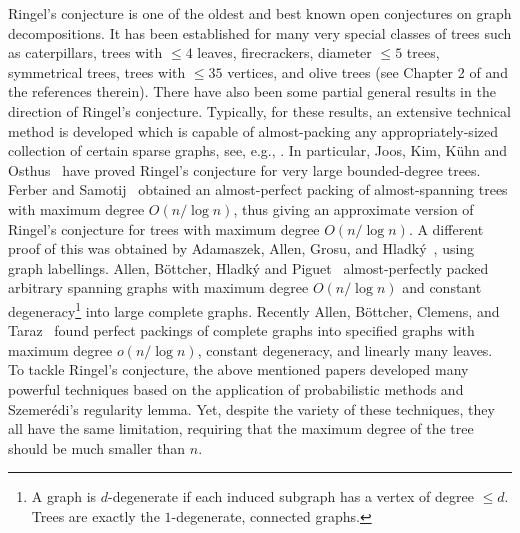 \documentclass{article}
\theoremstyle{definition}
\begin{document}
Ringel's conjecture is one of the oldest and best known open conjectures on graph decompositions. It has been established for many very special classes of trees such as caterpillars, trees with $\leq 4$ leaves, firecrackers,  diameter $\leq 5$ trees,   symmetrical trees, trees with $\leq 35$ vertices, and olive trees (see Chapter 2 of \cite{gallian2009dynamic} and the references therein).
There have also been some partial general results in the direction of Ringel's conjecture. Typically, for these results, an extensive technical method is developed which is capable of almost-packing any appropriately-sized collection of certain sparse graphs, see,
e.g., \cite{bottcher2016approximate, messuti2016packing, ferber2017packing, kim2016blow}.   In particular, Joos, Kim, K{\"u}hn and Osthus~\cite{joos2016optimal} have proved Ringel's conjecture for very large bounded-degree trees. Ferber and Samotij~\cite{ferber2016packing} obtained an almost-perfect packing of almost-spanning trees with maximum degree $O(n/\log n)$, thus giving an approximate version of Ringel's conjecture for trees with maximum degree $O(n/\log n)$. A different proof of this was obtained by
Adamaszek, Allen, Grosu, and Hladk{\'y}~\cite{adamaszek2016almost}, using graph labellings. Allen, B\"ottcher, Hladk{\'y} and Piguet~\cite{allen2017packing} almost-perfectly packed arbitrary spanning graphs with maximum degree $O(n/ \log n)$ and constant degeneracy\footnote{A graph is $d$-degenerate if each induced subgraph has a vertex of degree $\leq d$. Trees are exactly the $1$-degenerate, connected graphs.} into large complete graphs. 
Recently Allen, B\"ottcher, Clemens, and Taraz~\cite{allen2019perfectly} found perfect packings of complete graphs into specified graphs with maximum degree $o(n/\log n)$, constant degeneracy, and linearly many leaves.
To tackle Ringel's conjecture, the above mentioned papers developed many powerful techniques based on the application of probabilistic methods and
Szemer\'edi's regularity lemma. Yet, despite the variety of these techniques, they all have the same limitation, requiring that the maximum degree of the tree should be much smaller than $n$.
\end{document}
